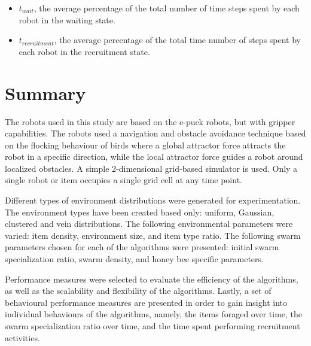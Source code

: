 \begin{itemize}
\item $t_{wait}$, the average percentage of the total number of time steps spent by each robot in the waiting state.
\item $t_{recruitment}$, the average percentage of the total time number of steps spent by each robot in the recruitment state.
\end{itemize}



\section{Summary}
\label{third:summary}
The robots used in this study are based on the e-puck robots, but with gripper capabilities. The robots used a navigation and obstacle avoidance technique based on the flocking behaviour of birds where a global attractor force attracts the robot in a specific direction, while the local attractor force guides a robot around localized obstacles. A simple 2-dimensional grid-based simulator is used. Only a single robot or item occupies a single grid cell at any time point.

Different types of environment distributions were generated for experimentation. The environment types have been created based only: uniform, Gaussian, clustered and vein distributions. The following environmental parameters were varied: item density, environment size, and item type ratio. The following swarm parameters chosen for each of the algorithms were presented: initial swarm specialization ratio, swarm density, and honey bee specific parameters.

Performance measures were selected to evaluate the efficiency of the algorithms, as well as the scalability and flexibility of the algorithms. Lastly, a set of behavioural performance measures are presented in order to gain insight into individual behaviours of the algorithms, namely, the items foraged over time, the swarm specialization ratio over time, and the time spent performing recruitment activities.


